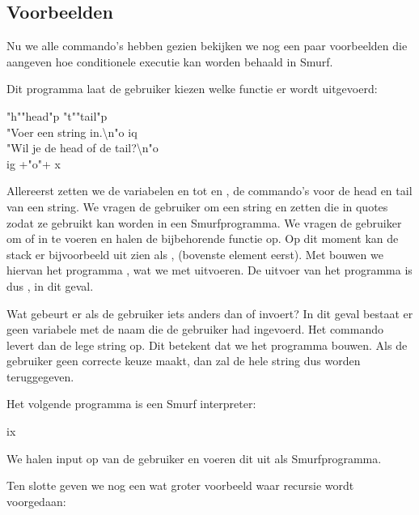\subsection{Voorbeelden}
\label{sec:intro:exmp}
Nu we alle commando's hebben gezien bekijken we nog een paar voorbeelden die
aangeven hoe conditionele executie kan worden behaald in Smurf.

\begin{exmp}
	\label{exmp:headortail}
	Dit programma laat de gebruiker kiezen welke functie er wordt uitgevoerd:
	\begin{smurf}
		"h""head"p "t""tail"p \\
		"Voer een string in.\textbackslash{}n"o iq \\
		"Wil je de head of de tail?\textbackslash{}n"o \\
		ig +"o"+ x
	\end{smurf}
	Allereerst zetten we de variabelen  en  tot  en
	, de commando's voor de head en tail van een string. We vragen de
	gebruiker om een string en zetten die in quotes zodat ze gebruikt kan worden
	in een Smurfprogramma. We vragen de gebruiker om  of  in
	te voeren en halen de bijbehorende functie op. Op dit moment kan de stack er
	bijvoorbeeld uit zien als ,  (bovenste element
	eerst). Met  bouwen we hiervan het programma
	, wat we met  uitvoeren. De
	uitvoer van het programma is dus , in dit geval.

	Wat gebeurt er als de gebruiker iets anders dan  of 
	invoert? In dit geval bestaat er geen variabele met de naam die de gebruiker
	had ingevoerd. Het commando  levert dan de lege string op. Dit
	betekent dat we het programma  bouwen. Als de
	gebruiker geen correcte keuze maakt, dan zal de hele string dus worden
	teruggegeven.
\end{exmp}

\begin{exmp}
	Het volgende programma is een Smurf interpreter:
	\begin{smurf}ix\end{smurf}
	We halen input op van de gebruiker en voeren dit uit als Smurfprogramma.
\end{exmp}

Ten slotte geven we nog een wat groter voorbeeld waar recursie wordt
voorgedaan:

